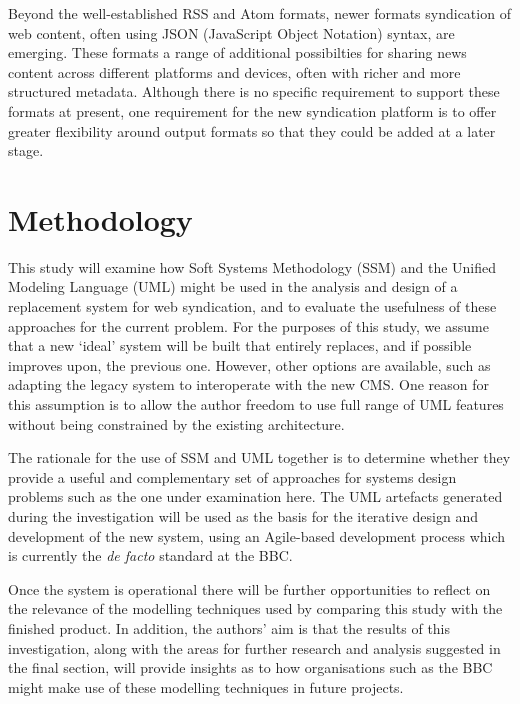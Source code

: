 \documentclass[runningheads,a4paper]{llncs}
\begin{document}
Beyond the well-established RSS and Atom formats, newer formats syndication of web content, often using JSON (JavaScript Object Notation) syntax, are emerging. These formats a range of additional possibilties for sharing news content across different platforms and devices, often with richer and more structured metadata. Although there is no specific requirement to support these formats at present, one requirement for the new syndication platform is to offer greater flexibility around output formats so that they could be added at a later stage.



\section{Methodology}

This study will examine how Soft Systems Methodology (SSM) and the Unified Modeling Language (UML) might be used in the analysis and design of a replacement system for web syndication, and to evaluate the usefulness of these approaches for the current problem. For the purposes of this study, we assume that a new `ideal' system will be built that entirely replaces, and if possible improves upon, the previous one. However, other options are available, such as adapting the legacy system to interoperate with the new CMS. One reason for this assumption is to allow the author freedom to use full range of UML features without being constrained by the existing architecture.

The rationale for the use of SSM and UML together is to determine whether they provide a useful and complementary set of approaches for systems design problems such as the one under examination here. The UML artefacts generated during the investigation will be used as the basis for the iterative design and development of the new system, using an Agile-based development process which is currently the \textit{de facto} standard at the BBC.

Once the system is operational there will be further opportunities to reflect on the relevance of the modelling techniques used by comparing this study with the finished product. In addition, the authors' aim is that the results of this investigation, along with the areas for further research and analysis suggested in the final section, will provide insights as to how organisations such as the BBC might make use of these modelling techniques in future projects.
\end{document}
